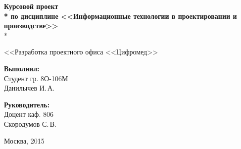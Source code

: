 \begin{titlepage}
\begin{center}
\vspace{2em}

\Large \textbf{Курсовой проект \\*
по дисциплине <<Информационные технологии в проектировании и производстве>>} \\*

\vspace{2em}

<<Разработка проектного офиса <<Цифромед>>
\end{center}

\vspace{6em}

\begin{minipage}[b]{22em}
  {\bfseries Выполнил:} \\
  \indent Студент гр. 8О-106М \\
  \indent Данилычев И.\,А.
\end{minipage} \begin{minipage}[b]{10em}
  {\bfseries Руководитель:} \\
  \indent Доцент каф. 806 \\
  \indent Скородумов С.\,В.
\end{minipage}
\vspace{\fill}

\begin{center}
Москва, 2015
\end{center}

\end{titlepage}

